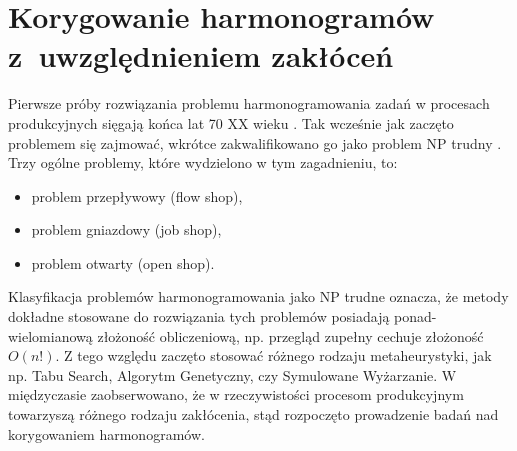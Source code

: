 \documentclass[printmode,oneside]{mgr}
\begin{document}
\chapter{Korygowanie harmonogramów z~uwzględnieniem zakłóceń \label{ch_lit_rev}}
Pierwsze próby rozwiązania problemu harmonogramowania zadań w procesach produkcyjnych sięgają końca lat 70 XX wieku \cite{Garey76}. Tak wcześnie jak zaczęto problemem się zajmować, wkrótce zakwalifikowano go jako problem NP trudny \cite{Garey76, Nawaz83}. Trzy ogólne problemy, które wydzielono w tym zagadnieniu, to:
\begin{itemize}
    \item problem przepływowy (flow shop),
    \item problem gniazdowy (job shop),
    \item problem otwarty (open shop).
\end{itemize}
Klasyfikacja problemów harmonogramowania jako NP trudne oznacza, że metody dokładne stosowane do rozwiązania tych problemów posiadają ponad-wielomianową złożoność obliczeniową, np. przegląd zupełny cechuje złożoność $O(n!)$. Z tego względu zaczęto stosować różnego rodzaju metaheurystyki, jak np. Tabu Search, Algorytm Genetyczny, czy Symulowane Wyżarzanie. W międzyczasie zaobserwowano, że w rzeczywistości procesom produkcyjnym towarzyszą różnego rodzaju zakłócenia, stąd rozpoczęto prowadzenie badań nad korygowaniem harmonogramów.
%
\end{document}
